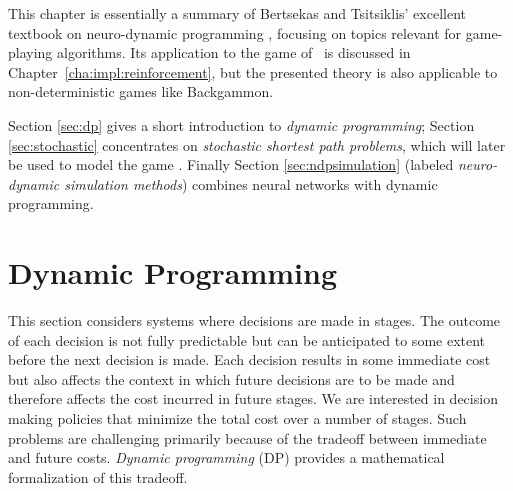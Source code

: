 This chapter is essentially a summary of Bertsekas and Tsitsiklis' excellent textbook on neuro-dynamic programming \cite{Bertsekas96}, focusing on topics relevant for game-playing algorithms. Its application to the game of \Abalone\ is discussed in Chapter~\ref{cha:impl:reinforcement}, but the presented theory is also applicable to non-deterministic games like Backgammon.

Section \ref{sec:dp} gives a short introduction to \emph{dynamic programming}; Section \ref{sec:stochastic} concentrates on \emph{stochastic shortest path problems}, which will later be used to model the game \Abalone. Finally Section \ref{sec:ndpsimulation} (labeled \emph{neuro-dynamic simulation methods}) combines neural networks with dynamic programming.









\section{Dynamic Programming} \label{sec:dp}
This section considers systems where decisions are made in stages. The outcome of each decision is not fully predictable but can be anticipated to some extent before the next decision is made. Each decision results in some immediate cost but also affects the context in which future decisions are to be made and therefore affects the cost incurred in future stages. We are interested in decision making policies that minimize the total cost over a number of stages. Such problems are challenging primarily because of the tradeoff between immediate and future costs. {\em Dynamic programming} (DP) provides a mathematical formalization of this tradeoff.




